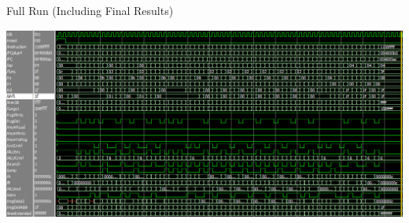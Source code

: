 \documentclass[12pt,letterpaper,titlepage]{article}
\begin{document}
\begin{raggedright}
\begin{center}
Full Run (Including Final Results)

\includegraphics[width=\textwidth, height=\textheight, keepaspectratio=true]{wav_post}

\end{center}

\end{raggedright}
\end{document}
